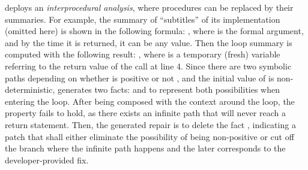 \documentclass[acmsmall,screen,review,anonymous,nonacm]{acmart}
\begin{document}
\toolName deploys an \emph{interprocedural analysis}, where procedures can be replaced by their summaries. 
For example, the summary of ``{subtitles}'' of its implementation (omitted here) is shown in the following formula: 
, where  is the formal argument, and by the time it is returned, it can be any value. 
Then the loop summary is computed with the following result: 
, 
where  is a temporary (fresh) variable referring to the return value of the call at line 4. 
Since there are two symbolic paths depending on whether  is positive or not , and the initial value of  is non-deterministic, \toolName generates two facts:  
 and   to represent both possibilities when entering the loop. 
After being composed with the context around the loop, the property  fails to hold, as there exists an infinite path that will never reach a return statement. 
Then, the generated repair is to delete the fact , indicating a patch that shall either eliminate the possibility of  being non-positive or cut off the branch where the infinite path happens and the later corresponds to the developer-provided fix. 





\end{document}
